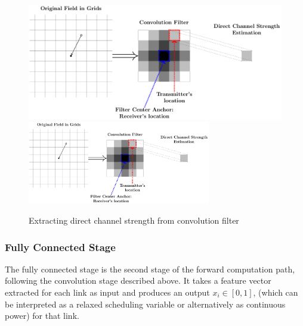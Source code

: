 \documentclass[journal,12pt,onecolumn,draftclsnofoot,]{IEEEtran}
\begin{document}
\begin{figure}
        \centering
        \ifOneColumn
            \includegraphics[width=12cm]{fig/DirectChannelStrength}
        \else
            \includegraphics[width=8cm]{fig/DirectChannelStrength}
        \fi
        \caption{Extracting direct channel strength from convolution filter}
        \label{fig:directchannelstrength}
\end{figure}


\subsubsection{Fully Connected Stage}
The fully connected stage is the second stage of the forward computation path,
following the convolution stage described above. It takes a feature vector
extracted for each link as input and produces an output $x_i \in [0,1]$,
(which can be interpreted as a relaxed scheduling variable or alternatively as
continuous power) for that link.
\end{document}
